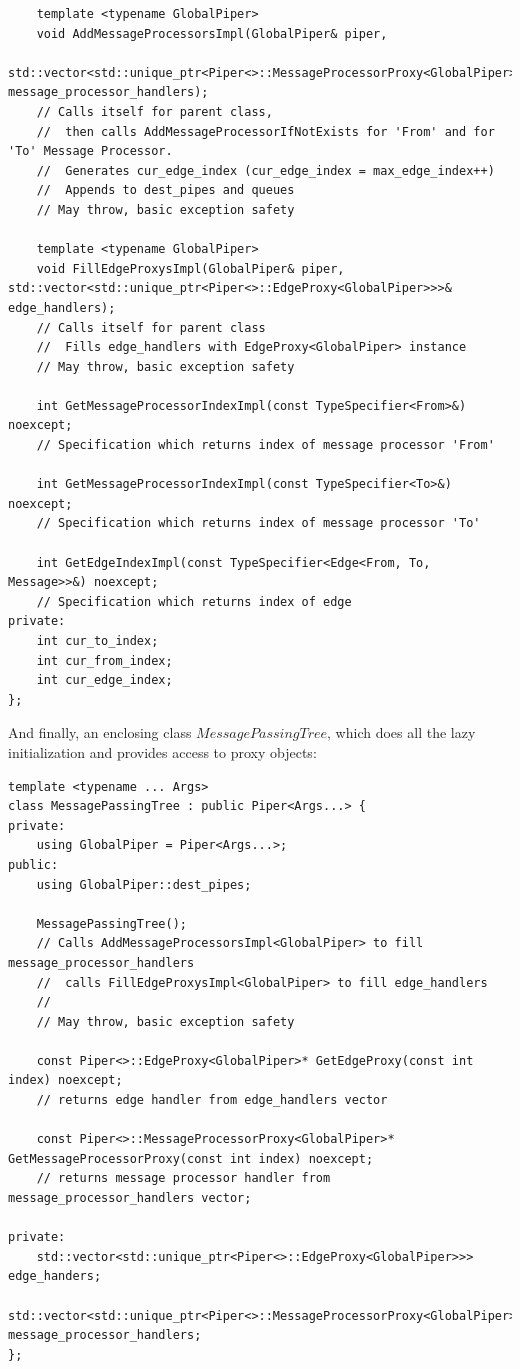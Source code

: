 \documentclass{article}
\begin{document}
\begin{lstlisting}
	template <typename GlobalPiper>
	void AddMessageProcessorsImpl(GlobalPiper& piper,
		std::vector<std::unique_ptr<Piper<>::MessageProcessorProxy<GlobalPiper>>>& message_processor_handlers);
	// Calls itself for parent class,
	//	then calls AddMessageProcessorIfNotExists for 'From' and for 'To' Message Processor.
	//	Generates cur_edge_index (cur_edge_index = max_edge_index++)
	//	Appends to dest_pipes and queues
	// May throw, basic exception safety

	template <typename GlobalPiper>
	void FillEdgeProxysImpl(GlobalPiper& piper, std::vector<std::unique_ptr<Piper<>::EdgeProxy<GlobalPiper>>>& edge_handlers);
	// Calls itself for parent class
	//	Fills edge_handlers with EdgeProxy<GlobalPiper> instance
	// May throw, basic exception safety

	int GetMessageProcessorIndexImpl(const TypeSpecifier<From>&) noexcept;
	// Specification which returns index of message processor 'From'

	int GetMessageProcessorIndexImpl(const TypeSpecifier<To>&) noexcept;
	// Specification which returns index of message processor 'To'

	int GetEdgeIndexImpl(const TypeSpecifier<Edge<From, To, Message>>&) noexcept;
	// Specification which returns index of edge
private:
	int cur_to_index;
	int cur_from_index;
	int cur_edge_index;
};
\end{lstlisting}

And finally, an enclosing class $MessagePassingTree$, which does all the lazy initialization and provides access to proxy objects:
\begin{lstlisting}
template <typename ... Args>
class MessagePassingTree : public Piper<Args...> {
private:
	using GlobalPiper = Piper<Args...>;
public:
	using GlobalPiper::dest_pipes;

	MessagePassingTree();
	// Calls AddMessageProcessorsImpl<GlobalPiper> to fill message_processor_handlers
	//	calls FillEdgeProxysImpl<GlobalPiper> to fill edge_handlers
	//
	// May throw, basic exception safety

	const Piper<>::EdgeProxy<GlobalPiper>* GetEdgeProxy(const int index) noexcept;
	// returns edge handler from edge_handlers vector

	const Piper<>::MessageProcessorProxy<GlobalPiper>* GetMessageProcessorProxy(const int index) noexcept;
	// returns message processor handler from message_processor_handlers vector;

private:
	std::vector<std::unique_ptr<Piper<>::EdgeProxy<GlobalPiper>>> edge_handers;
	std::vector<std::unique_ptr<Piper<>::MessageProcessorProxy<GlobalPiper>>> message_processor_handlers;
};
\end{lstlisting}
\end{document}
